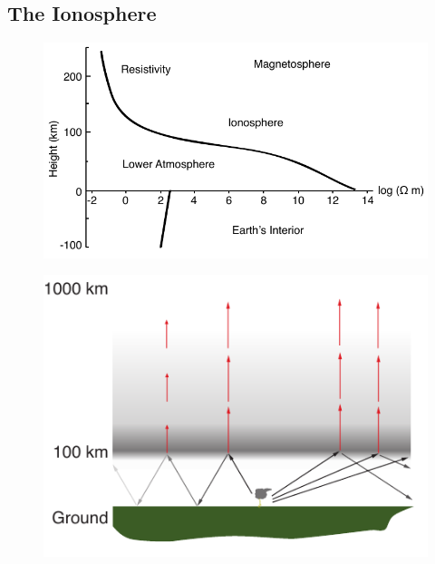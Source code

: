 \subsection{The Ionosphere}



\begin{figure}[ht!]
	\centering
	\includegraphics[scale=1]{Introduction/Figures/Atmospheric_Conductivity.pdf}\\
	\caption{}
	\label{intro:fig:ionosphere}
\end{figure}



\begin{figure}[ht!]
	\centering
	\includegraphics[scale=1]{Introduction/Figures/EIWG.pdf}\\
	\caption{}
	\label{intro:fig:eiwg}
\end{figure}


